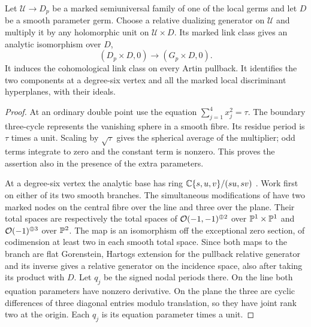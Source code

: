 \begin{lemma}\label{lem:linkperiods}
Let $\mathcal U\to D_p$ be a marked semiuniversal family of one of the
local germs and let $D$ be a smooth parameter germ. Choose a relative
dualizing generator on $\mathcal U$ and multiply it by any holomorphic
unit on $\mathcal U\times D$. Its marked link class gives an analytic
isomorphism over $D$,
\[
       (D_p\times D,0)\longrightarrow (G_p\times D,0).
\]
It induces the cohomological link class on every Artin pullback. It
identifies the two components at a degree-six vertex and all the marked
local discriminant hyperplanes, with their ideals.
\end{lemma}
\begin{proof}
At an ordinary double point use the equation
$\sum_{j=1}^4 x_j^2=\tau$. The boundary three-cycle represents the
vanishing sphere in a smooth fibre. Its residue period is $\tau$ times
a unit. Scaling by $\sqrt{\tau}$ gives the spherical average of the
multiplier; odd terms integrate to zero and the constant term is
nonzero. This proves the assertion also in the presence of the extra
parameters.

At a degree-six vertex the analytic base has ring
$\mathbb C\{s,u,v\}/(su,sv)$ \cite[\S\S5--8]{Alt}. Work first on either
of its two smooth branches. The simultaneous modifications of
\cite[\S3, Proposition~3.8]{W5} have two marked nodes on the central
fibre over the line and three over the plane. Their total spaces are
respectively the total spaces of $\mathcal O(-1,-1)^{\oplus2}$ over
$\mathbb P^1\times\mathbb P^1$ and $\mathcal O(-1)^{\oplus3}$ over $\mathbb P^2$. The map is
an isomorphism off the exceptional zero section, of codimension at
least two in each smooth total space. Since both maps to the branch
are flat Gorenstein, Hartogs extension for the pullback relative
generator and its inverse gives a relative generator on the incidence
space, also after taking its product with $D$. Let $q_j$ be the signed
nodal periods there. On the line both equation parameters have nonzero
derivative. On the plane the three are cyclic differences of three
diagonal entries modulo translation, so they have joint rank two at
the origin. Each $q_j$ is its equation parameter times a unit.


\end{proof}
